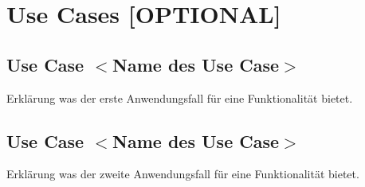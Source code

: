 
	\chapter{Use Cases [OPTIONAL]}
	\section{Use Case $<$Name des Use Case$>$}
	Erklärung was der erste Anwendungsfall für eine Funktionalität bietet.
    \section{Use Case $<$Name des Use Case$>$}
    	Erklärung was der zweite Anwendungsfall für eine Funktionalität bietet.
